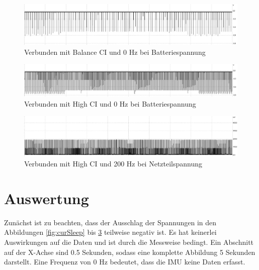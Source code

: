 \begin{figure}[!hbtp]
	\centering
	\includegraphics[width=1\linewidth]{res/ciMi0.jpg}
	\caption{Verbunden mit Balance CI und 0 Hz bei Batteriespannung}
	\label{fig:curMi}
\end{figure}
\begin{figure}[!hbtp]
	\centering
	\includegraphics[width=1\linewidth]{res/ciHi0.jpg}
	\caption{Verbunden mit High CI und 0 Hz bei Batteriespannung}
	\label{fig:curHi}
\end{figure}
\begin{figure}[!hbtp]
	\centering
	\includegraphics[width=1\linewidth]{res/wearNetzteil200hz.jpg}
	\caption{Verbunden mit High CI und 200 Hz bei Netzteilspannung}
	\label{fig:cur200}
\end{figure}

\section{Auswertung}
Zunächst ist zu beachten, dass der Ausschlag der Spannungen in den Abbildungen \ref{fig:curSleep} bis \ref{fig:cur200} teilweise negativ ist.
Es hat keinerlei Auswirkungen auf die Daten und ist durch die Messweise bedingt.
Ein Abschnitt auf der X-Achse sind 0.5 Sekunden, sodass eine komplette Abbildung 5 Sekunden darstellt.
Eine Frequenz von 0 Hz bedeutet, dass die IMU keine Daten erfasst.

